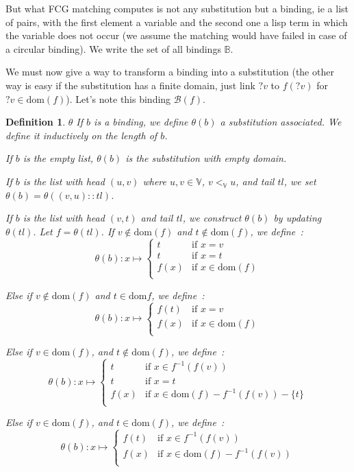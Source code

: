 \documentclass[]{article}
\newcommand{\B}{\mathscr{B}}
\newcommand{\1}{\mathbbm{1}}
\newcommand{\0}{\mathbbm{0}}
\newtheorem{defi}{Definition}
\newcommand{\dom}{\text{dom}}
\begin{document}
But what FCG matching computes is not any substitution but a binding, ie a list
of pairs, with the first element a variable and the second one a lisp term in which
the variable does not occur (we assume the matching would have failed in case of
a circular binding). We write the set of all bindings $\mathbb{B}$.

We must now give a way to transform a binding into a substitution (the other way is
easy if the substitution has a finite domain, just link $?v$ to $f(?v)$ for
$?v\in\text{dom}(f)$). Let's note this binding $\B(f)$.

\begin{defi}{$\theta$}
    If $b$ is a binding, we define $\theta(b)$ a substitution associated. We define
    it inductively on the length of $b$.

    If $b$ is the empty list, $\theta(b)$ is the substitution with empty domain.

    If $b$ is the list with head $(u,v)$ where $u,v\in\mathbb{V}$, $v <_\mathbb{V} u$,
    and tail $tl$, we set $\theta(b) = \theta((v,u) :: tl)$.

    If $b$ is the list with head $(v,t)$ and tail $tl$, we construct $\theta(b)$ by
    updating $\theta(tl)$. Let $f = \theta(tl)$. If $v\not\in\dom(f)$ and $t\not\in\dom(f)$,
    we define~:
    \[\theta(b) : x \mapsto \left\{\begin{array}{ll}
        t & \text{if } x = v \\
        t & \text{if } x = t \\
        f(x) & \text{if } x\in\dom(f) \\
    \end{array}\right.\]

    Else if $v\not\in\dom(f)$ and $t\in\dom{f}$, we define~:
    \[\theta(b) : x\mapsto\left\{\begin{array}{ll}
        f(t) & \text{if } x = v \\
        f(x) & \text{if } x\in\dom(f) \\
    \end{array}\right.\]

    Else if $v\in\dom(f)$, and $t\not\in\dom(f)$, we define~:
    \[\theta(b) : x \mapsto \left\{\begin{array}{ll}
        t & \text{if } x\in f^{-1}(f(v)) \\
        t & \text{if } x = t \\
        f(x) & \text{if } x\in\dom(f) - f^{-1}(f(v)) - \{t\} \\
    \end{array}\right.\]

    Else if $v\in\dom(f)$, and $t\in\dom(f)$, we define~:
    \[\theta(b) : x \mapsto \left\{\begin{array}{ll}
        f(t) & \text{if } x\in f^{-1}(f(v)) \\
        f(x) & \text{if } x\in\dom(f) - f^{-1}(f(v)) \\
    \end{array}\right.\]
\end{defi}
\end{document}
